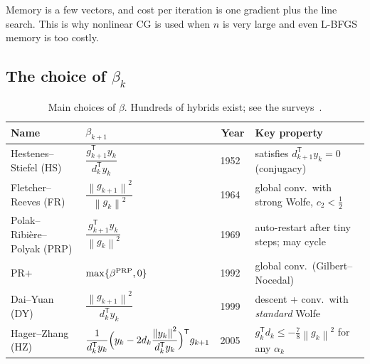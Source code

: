 \documentclass[11pt,a4paper]{article}
\theoremstyle{remark}
\newcommand{\norm}[1]{\left\lVert #1\right\rVert}
\newcommand{\ip}[2]{#1^{\mathsf T}#2}
\newcommand{\T}{^{\mathsf T}}
\begin{document}
Memory is a few vectors, and cost per iteration is one gradient plus the line search. This is why nonlinear CG is used when $n$ is very large and even L-BFGS memory is too costly.

\subsection{The choice of $\beta_k$}

\begin{table}[h]
\centering\footnotesize
\begin{tabular}{@{}>{\raggedright\arraybackslash}p{2.6cm}lc>{\raggedright\arraybackslash}p{4.6cm}@{}}
\toprule
Name & $\beta_{k+1}$ & Year & Key property\\
\midrule
Hestenes--Stiefel (HS) & $\dfrac{\ip{g_{k+1}}{y_k}}{\ip{d_k}{y_k}}$ & 1952~\cite{HestenesStiefel1952} & satisfies $\ip{d_{k+1}}{y_k}=0$ (conjugacy)\\[1.2ex]
Fletcher--Reeves (FR) & $\dfrac{\norm{g_{k+1}}^2}{\norm{g_k}^2}$ & 1964~\cite{FletcherReeves1964} & global conv.\ with strong Wolfe, $c_2<\tfrac12$~\cite{AlBaali1985}\\[1.2ex]
Polak--Ribi\`ere--Polyak (PRP) & $\dfrac{\ip{g_{k+1}}{y_k}}{\norm{g_k}^2}$ & 1969~\cite{PolakRibiere1969,Polyak1969} & auto-restart after tiny steps; may cycle~\cite{Powell1984}\\[1.2ex]
PR$+$ & $\max\{\beta^{\rm PRP},0\}$ & 1992~\cite{GilbertNocedal1992} & global conv.\ (Gilbert--Nocedal)\\[1.2ex]
Dai--Yuan (DY) & $\dfrac{\norm{g_{k+1}}^2}{\ip{d_k}{y_k}}$ & 1999~\cite{DaiYuan1999} & descent + conv.\ with \emph{standard} Wolfe\\[1.2ex]
Hager--Zhang (HZ) & $\dfrac{1}{\ip{d_k}{y_k}}\Bigl(y_k-2d_k\dfrac{\norm{y_k}^2}{\ip{d_k}{y_k}}\Bigr)\T g_{k+1}$ & 2005~\cite{HagerZhang2005} & $\ip{g_k}{d_k}\le-\tfrac78\norm{g_k}^2$ for any $\alpha_k$\\
\bottomrule
\end{tabular}
\caption{Main choices of $\beta$. Hundreds of hybrids exist; see the surveys~\cite{HagerZhang2006,Dai2011,NarushimaYabe2014,Andrei2020}.}
\label{tab:beta}
\end{table}
\end{document}
